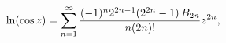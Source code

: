 \[\mathop{\ln\/}\nolimits\!\left(\mathop{\cos\/}\nolimits z\right)=\sum_{n=1}^{%
\infty}\frac{(-1)^{n}2^{2n-1}(2^{2n}-1)\mathop{B_{2n}\/}\nolimits}{n(2n)!}z^{2%
n},\]